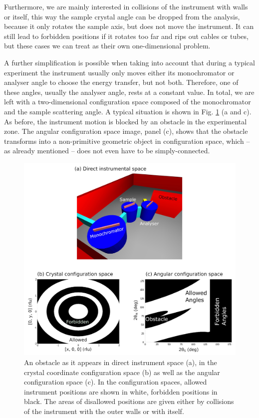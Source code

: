 Furthermore, we are mainly interested in collisions of the instrument with walls 
or itself, this way the sample crystal angle can be dropped from the analysis, 
because it only rotates the sample axis, but does not move the instrument. 
It can still lead to forbidden positions if it rotates too far and rips out cables 
or tubes, but these cases we can treat as their own one-dimensional problem. 

A further simplification is possible when taking into account that during a 
typical experiment the instrument usually only moves either its monochromator 
or analyser angle to choose the energy transfer, but not both. 
Therefore, one of these angles, usually the analyser angle, rests at a constant 
value. In total, we are left with a two-dimensional configuration space composed 
of the monochromator and the sample scattering angle. 
A typical situation is shown in Fig. \ref{fig:tas_wall} (a and c). 
As before, the instrument motion is blocked by an obstacle in the experimental zone. 
The angular configuration space image, panel (c), shows that the obstacle 
transforms into a non-primitive geometric object in configuration space, 
which -- as already mentioned -- does not even have to be simply-connected.

\begin{figure}[htb]
	\centering
	\includegraphics[width = 0.95 \textwidth]{figures/tas_wall.jpg}
	\caption[TAS configuration spaces.]{
		An obstacle as it appears in direct instrument space (a), in the 
		crystal coordinate configuration space (b) as well as the angular
		configuration space (c).
		In the configuration spaces, allowed instrument positions are 
		shown in white, forbidden positions in black. 
		The areas of disallowed positions are given either by collisions 
		of the instrument with the outer walls or with itself.}
	\label{fig:tas_wall}
\end{figure}


